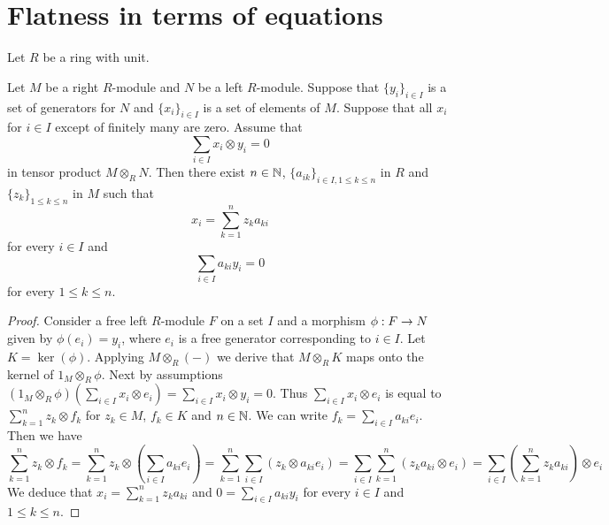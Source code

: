 \section{Flatness in terms of equations}
\noindent
Let $R$ be a ring with unit.

\begin{proposition}\label{proposition:zerocriterion}
Let $M$ be a right $R$-module and $N$ be a left $R$-module. Suppose that $\{y_i\}_{i\in I}$ is a set of generators for $N$ and $\{x_i\}_{i\in I}$ is a set of  elements of $M$. Suppose that all $x_i$ for $i\in I$ except of finitely many are zero. Assume that
$$\sum_{i\in I}x_i\otimes y_i=0$$
in tensor product $M\otimes_RN$. Then there exist $n\in {\mathbb N}$, $\{a_{ik}\}_{i\in I,1\leq k\leq n}$ in $R$ and $\{z_k\}_{1\leq k\leq n}$ in $M$ such that
$$x_i=\sum^n_{k=1}z_ka_{ki}$$
for every $i\in I$ and 
$$\sum_{i\in I}a_{ki}y_i= 0$$
for every $1\leq k\leq n$.
\end{proposition}
\begin{proof}
Consider a free left $R$-module $F$ on a set $I$ and a morphism $\phi:F\rightarrow N$ given by $\phi(e_i)=y_i$, where $e_i$ is a free generator corresponding to $i\in I$. Let $K=\ker( \phi)$. Applying $M\otimes_R(-)$ we derive that $M\otimes_RK$ maps onto the kernel of $1_M\otimes_R\phi$.
Next by assumptions $(1_M\otimes_R\phi)(\sum_{i\in I}x_i\otimes e_i)=\sum_{i\in I}x_i\otimes y_i=0$. Thus $\sum_{i\in I}x_i\otimes e_i$ is equal to $\sum^n_{k=1}z_k\otimes f_k$ for $z_k\in M$, $f_k\in K$ and $n\in {\mathbb N}$. We can write $f_k=\sum_{i\in I}a_{ki}e_i$. Then we have
$$\sum^n_{k=1}z_k\otimes f_k=\sum^n_{k=1}z_k\otimes\left(\sum_{i\in I}a_{ki}e_i\right)=\sum^n_{k=1}\sum_{i\in I}\left(z_k\otimes a_{ki}e_i\right)=\sum_{i\in I}\sum^n_{k=1}\left(z_ka_{ki}\otimes e_i\right)=\sum_{i\in I}\left(\sum^n_{k=1}z_k a_{ki}\right)\otimes e_i$$
We deduce that $x_i=\sum^n_{k=1}z_ka_{ki}$ and $0=\sum_{i\in I}a_{ki}y_i$  for every $i\in I$ and $1\leq k\leq n$.
\end{proof}

